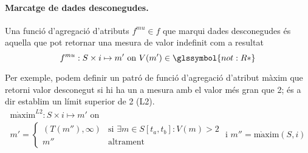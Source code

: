 \paragraph{Marcatge de dades desconegudes.}
Una funció d'agregació d'atributs $f^{mu} \in f$ que marqui
dades desconegudes és aquella que pot retornar una mesura de valor
indefinit com a resultat
\[
f^{mu}: S \times i \mapsto m' \text{ on } V(m')\in \glssymbol{not:R*}
\]


Per exemple, podem definir un patró de funció d'agregació d'atribut
màxim que retorni valor desconegut
si hi ha un a mesura amb el valor més gran que 2; és a dir establim un
límit superior de 2 (L2). 
\begin{gather*}
  \operatorname{m\grave{a}xim}^{L2}: S \times i \mapsto m' \text{ on }\\
  m' = \begin{cases}
    (T(m''),\infty) &\text{si }  \exists m\in S[t_a,t_b]: V(m)>2\\
    m'' & \text{altrament }
  \end{cases} \text{ i } m''= \operatorname{m\grave{a}xim}(S,i)
\end{gather*}

















